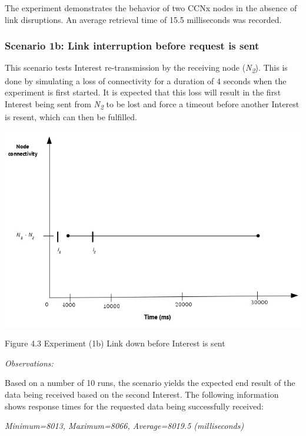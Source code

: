 \documentclass[a4paper,12pt]{report}      %
\begin{document}
The experiment demonstrates the behavior of two CCNx nodes in the absence of link disruptions. An average retrieval time of 15.5 milliseconds was recorded.

\subsubsection{Scenario 1b: Link interruption before request is sent}

This scenario tests Interest re-transmission by the receiving node (\emph{N\textsubscript{2}}). This is done by simulating a
loss of connectivity for a duration of 4 seconds when the experiment is first started. It is expected that this loss will result in
the first Interest being sent from \emph{N\textsubscript{2}} to be lost and force a timeout before another Interest is resent, which can then be fulfilled.

\noindent\includegraphics[scale=0.55]{exp1b_timediag.jpg}\newline
\begin{center}Figure 4.3 Experiment (1b) Link down before Interest is sent\end{center}

\vspace*{1\baselineskip}\noindent\emph{Observations:}

Based on a number of 10 runs, the scenario yields the expected end result of the data being received
based on the second Interest. The following information shows response times for the requested
data being successfully received:
\begin{center}\textsl{Minimum=8013, Maximum=8066, Average=8019.5 (milliseconds)}\end{center}
\end{document}
